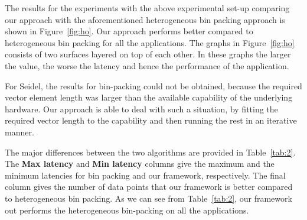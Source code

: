 The results for the experiments with the above experimental set-up
comparing our approach with the aforementioned heterogeneous bin packing
approach is shown in Figure~\ref{fig:ho}. Our approach performs better
compared to heterogeneous bin packing for all the applications. The
graphs in Figure~\ref{fig:ho} consists of two surfaces layered on top of
each other. In these graphs the larger the value, the worse the latency
and hence the performance of the application. %

For Seidel, the results for bin-packing could not be obtained, because
the required vector element length was larger than the available
capability of the underlying hardware. Our approach is able to deal with
such a situation, by fitting the required vector length to the
capability and then running the rest in an iterative manner.

The major differences between the two algorithms are provided in
Table~\ref{tab:2}. The \textbf{Max latency} and \textbf{Min latency}
columns give the maximum and the minimum latencies for bin packing and
our framework, respectively. The final column gives the number of data
points that our framework is better compared to heterogeneous bin
packing. As we can see from Table~\ref{tab:2}, our framework out
performs the heterogeneous bin-packing on all the applications.

\begin{small}
  \begin{table}[t!]
    \centering
    \caption{Major statistics comparing heterogeneous bin packing and our framework}
    \label{tab:2}
  \end{table}
\end{small}

